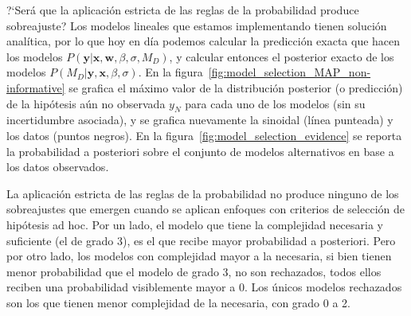 \documentclass[a4paper,11pt]{book}
\theoremstyle{definition}
\begin{document}
%
%



?`Ser\'a que la aplicaci\'on estricta de las reglas de la probabilidad produce sobreajuste?
%
Los modelos lineales que estamos implementando tienen soluci\'on anal\'itica, por lo que hoy en d\'ia podemos calcular la predicci\'on exacta que hacen los modelos $P(\bm{y}|\bm{x}, \bm{w}, \beta, \sigma, M_D)$, y calcular entonces el posterior exacto de los modelos $P(M_D|\bm{y},\bm{x}, \beta, \sigma)$.
%
En la figura~\ref{fig:model_selection_MAP_non-informative} se grafica el m\'aximo valor de la distribuci\'on posterior (o predicci\'on) de la hip\'otesis a\'un no observada $y_N$ para cada uno de los modelos (sin su incertidumbre asociada), y se grafica nuevamente la sinoidal (l\'inea punteada) y los datos (puntos negros).
%
En la figura~\ref{fig:model_selection_evidence} se reporta la probabilidad a posteriori sobre el conjunto de modelos alternativos en base a los datos observados.


La aplicaci\'on estricta de las reglas de la probabilidad no produce ninguno de los sobreajustes que emergen cuando se aplican enfoques con criterios de selecci\'on de hip\'otesis ad hoc.
%
Por un lado, el modelo que tiene la complejidad necesaria y suficiente (el de grado 3), es el que recibe mayor probabilidad a posteriori.
%
Pero por otro lado, los modelos con complejidad mayor a la necesaria, si bien tienen menor probabilidad que el modelo de grado 3, no son rechazados, todos ellos reciben una probabilidad visiblemente mayor a 0.
%
Los \'unicos modelos rechazados son los que tienen menor complejidad de la necesaria, con grado 0 a 2.
\end{document}
